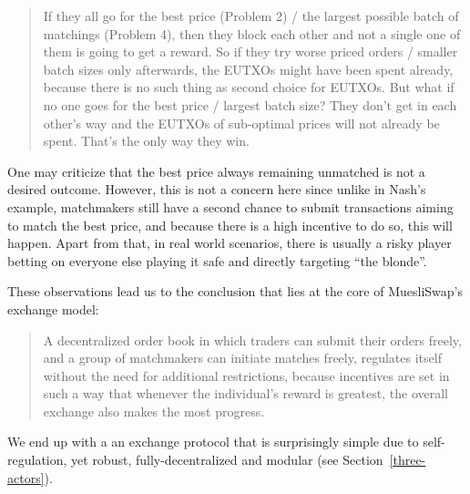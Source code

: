 \documentclass[11pt]{article}
\begin{document}
\begin{itemize}
    \begin{quotation}
        If they all go for the best price (Problem 2) / the largest possible batch of matchings (Problem 4), then they block each other and not a single one of them is going to get a reward. So if they try worse priced orders / smaller batch sizes only afterwards, the EUTXOs might have been spent already, because there is no such thing as second choice for EUTXOs. But what if no one goes for the best price / largest batch size? They don't get in each other's way and the EUTXOs of sub-optimal prices will not already be spent. That's the only way they win.
    \end{quotation}
    
    One may criticize that the best price always remaining unmatched is not a desired outcome. However, this is not a concern here since unlike in Nash's example, matchmakers still have a second chance to submit transactions aiming to match the best price, and because there is a high incentive to do so, this will happen. Apart from that, in real world scenarios, there is usually a risky player betting on everyone else playing it safe and directly targeting ``the blonde''.
    
    These observations lead us to the conclusion that lies at the core of MuesliSwap's exchange model:
    
    \begin{quotation}
        A decentralized order book in which traders can submit their orders freely, and a group of matchmakers can initiate matches freely, regulates itself without the need for additional restrictions, because incentives are set in such a way that whenever the individual's reward is greatest, the overall exchange also makes the most progress.
    \end{quotation}

    We end up with a an exchange protocol that is surprisingly simple due to self-regulation, yet robust, fully-decentralized and modular (see Section~\ref{three-actors}).
    
    
    
\end{itemize}
\end{document}
